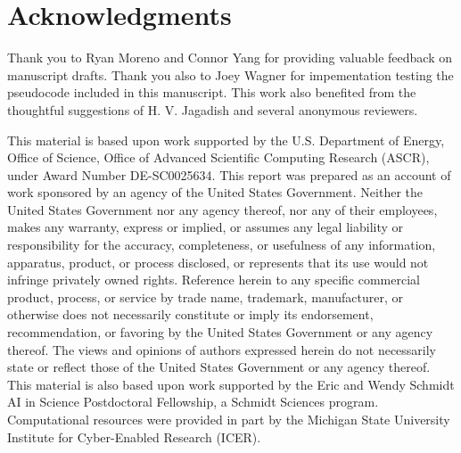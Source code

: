 \section*{Acknowledgments}
{\footnotesize
Thank you to Ryan Moreno and Connor Yang for providing valuable feedback on manuscript drafts.
Thank you also to Joey Wagner for impementation testing the pseudocode included in this manuscript.
This work also benefited from the thoughtful suggestions of H. V. Jagadish and several anonymous reviewers.
}

{\footnotesize
This material is based upon work supported by the U.S. Department of Energy, Office of Science, Office of Advanced Scientific Computing Research (ASCR), under Award Number DE-SC0025634.
This report was prepared as an account of work sponsored by an agency of the United States Government.
Neither the United States Government nor any agency thereof, nor any of their employees, makes any warranty, express or implied, or assumes any legal liability or responsibility for the accuracy, completeness, or usefulness of any information, apparatus, product, or process disclosed, or represents that its use would not infringe privately owned rights.
Reference herein to any specific commercial product, process, or service by trade name, trademark, manufacturer, or otherwise does not necessarily constitute or imply its endorsement, recommendation, or favoring by the United States Government or any agency thereof.
The views and opinions of authors expressed herein do not necessarily state or reflect those of the United States Government or any agency thereof.
This material is also based upon work supported by the Eric and Wendy Schmidt AI in Science Postdoctoral Fellowship, a Schmidt Sciences program.
Computational resources were provided in part by the Michigan State University Institute for Cyber-Enabled Research (ICER).
}

